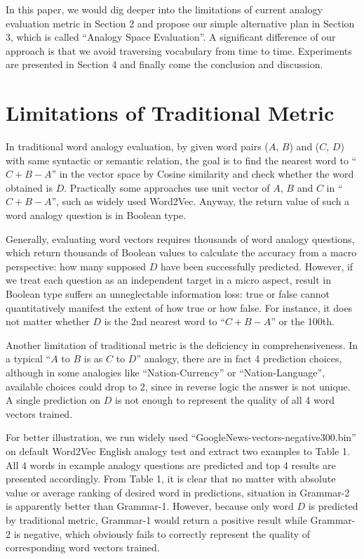 \documentclass[11pt,letterpaper]{article}
\begin{document}
In this paper, we would dig deeper into the limitations of current analogy evaluation metric in Section 2 and propose our simple alternative plan  in Section 3, which is called ``Analogy Space Evaluation''. A significant difference of our approach is that we avoid traversing vocabulary from time to time. Experiments are presented in Section 4 and finally come the conclusion and discussion.

\section{Limitations of Traditional Metric}

In traditional word analogy evaluation, by given word pairs ($A$, $B$) and ($C$, $D$) with same syntactic or semantic relation, the goal is to find the nearest word to ``$C+B-A$'' in the vector space by Cosine similarity and check whether the word obtained is $D$. Practically some approaches use unit vector of $A$, $B$ and $C$ in ``$C+B-A$'', such as widely used Word2Vec. Anyway, the return value of such a word analogy question is in Boolean type. 

Generally, evaluating word vectors requires thousands of word analogy questions, which return thousands of Boolean values to calculate the accuracy from a macro perspective: how many supposed $D$ have been successfully predicted. However, if we treat each question as an independent target in a micro aspect, result in Boolean type suffers an unneglectable information loss: true or false cannot quantitatively manifest the extent of how true or how false. For instance, it does not matter whether $D$ is the 2nd nearest word to ``$C+B-A$'' or the 100th.

Another limitation of traditional metric is the deficiency in comprehensiveness. In a typical ``$A$ to $B$ is as $C$ to $D$'' analogy, there are in fact 4 prediction choices, although in some analogies like ``Nation-Currency'' or ``Nation-Language'', available choices could drop to 2, since in reverse logic the answer is not unique. A single prediction on $D$ is not enough to represent the quality of all 4 word vectors trained.

For better illustration, we run widely used ``GoogleNews-vectors-negative300.bin'' on default Word2Vec English analogy test and extract two examples to Table 1. All 4 words in example analogy questions are predicted and top 4 results are presented accordingly. From Table 1, it is clear that no matter with absolute value or average ranking of desired word in predictions, situation in Grammar-2 is apparently better than Grammar-1. However, because only word $D$ is predicted by traditional metric, Grammar-1 would return a positive result while Grammar-2 is negative, which obviously fails to correctly represent the quality of corresponding word vectors trained.
\end{document}
